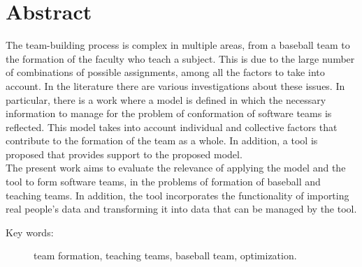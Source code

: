 
\section*{Abstract} 

The team-building process is complex in multiple areas, from a baseball team to the formation of the faculty who teach a subject. This is due to the large number of combinations of possible assignments, among all the factors to take into account. In the literature there are various investigations about these issues. In particular, there is a work where a model is defined in which the necessary information to manage for the problem of conformation of software teams is reflected. This model takes into account individual and collective factors that contribute to the formation of the team as a whole. In addition, a tool is proposed that provides support to the proposed model. \\

The present work aims to evaluate the relevance of applying the model and the tool to form software teams, in the problems of formation of baseball and teaching teams. In addition, the tool incorporates the functionality of importing real people's data and transforming it into data that can be managed by the tool.

\begin{description}
	\item[Key words:]{team formation, teaching teams, baseball team, optimization.}
\end{description}